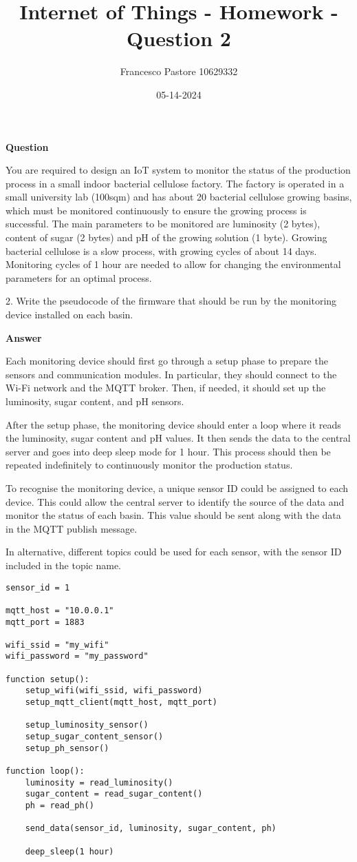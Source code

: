 \documentclass[12pt]{article}
\title{Internet of Things - Homework - Question 2}
\author{Francesco Pastore 10629332}
\date{05-14-2024}
\begin{document}
\maketitle

\textbf{Question}

You are required to design an IoT system to monitor the status of the production process in a small indoor bacterial cellulose factory.
The factory is operated in a small university lab (100sqm) and has about 20 bacterial cellulose growing basins, which must be monitored continuously to ensure the growing process is successful.
The main parameters to be monitored are luminosity (2 bytes), content of sugar (2 bytes) and pH of the growing solution (1 byte).
Growing bacterial cellulose is a slow process, with growing cycles of about 14 days.
Monitoring cycles of 1 hour are needed to allow for changing the environmental parameters for an optimal process.

2. Write the pseudocode of the firmware that should be run by the monitoring device installed on each basin.

\textbf{Answer}

Each monitoring device should first go through a setup phase to prepare the sensors and communication modules.
In particular, they should connect to the Wi-Fi network and the MQTT broker.
Then, if needed, it should set up the luminosity, sugar content, and pH sensors.

After the setup phase, the monitoring device should enter a loop where it reads the luminosity, sugar content and pH values.
It then sends the data to the central server and goes into deep sleep mode for 1 hour.
This process should then be repeated indefinitely to continuously monitor the production status.

To recognise the monitoring device, a unique sensor ID could be assigned to each device.
This could allow the central server to identify the source of the data and monitor the status of each basin.
This value should be sent along with the data in the MQTT publish message.

In alternative, different topics could be used for each sensor, with the sensor ID included in the topic name.

\begin{verbatim}
sensor_id = 1

mqtt_host = "10.0.0.1"
mqtt_port = 1883

wifi_ssid = "my_wifi"
wifi_password = "my_password"

function setup():
    setup_wifi(wifi_ssid, wifi_password)
    setup_mqtt_client(mqtt_host, mqtt_port)

    setup_luminosity_sensor()
    setup_sugar_content_sensor()
    setup_ph_sensor()

function loop():
    luminosity = read_luminosity()
    sugar_content = read_sugar_content()
    ph = read_ph()

    send_data(sensor_id, luminosity, sugar_content, ph)

    deep_sleep(1 hour)
\end{verbatim}
\end{document}
